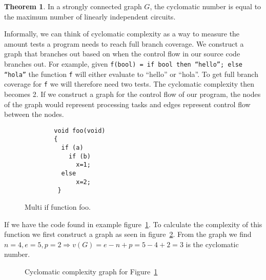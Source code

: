 \documentclass[12pt]{report}
\theoremstyle{definition}
\newtheorem*{theorem}{Theorem}
\theoremstyle{theorem}
\begin{document}
\begin{theorem}
In a strongly connected graph $G$, the cyclomatic number is equal to the
maximum number of linearly independent circuits.~\cite{McCabe}
\end{theorem}

Informally, we can think of cyclomatic complexity as a way to measure the amount
tests a program needs to reach full branch coverage. We construct a graph that
branches out based on when the control flow in our source code branches out. For
example, given \texttt{f(bool) = if bool then ``hello''; else ``hola''} the
function \texttt{f} will either evaluate to ``hello'' or ``hola''. To get full
branch coverage for \texttt{f} we will therefore need two tests. The cyclomatic
complexity then becomes 2. If we construct a graph for the control flow of our
program, the nodes of the graph would represent processing tasks and edges
represent control flow between the nodes. 

\begin{figure}[H]
    \begin{lstlisting}
        void foo(void)
        {
          if (a)
            if (b) 
              x=1;
          else
              x=2;
         }
    \end{lstlisting}
    \caption{Multi if function foo.}\label{c1excode}
\end{figure}

If we have the code found in example figure~\ref{c1excode}. To calculate the
complexity of this function we first construct a graph as seen in
figure~\ref{fig:c1exgraph}. From the graph we find $n=4, e=5, p=2\Rightarrow
v(G)=e-n+p=5-4+2=3$ is the cyclomatic number.

\begin{figure}[H]
    \centering
    \caption{Cyclomatic complexity graph for Figure~\ref{c1excode}}\label{fig:c1exgraph}
\end{figure}
\end{document}

